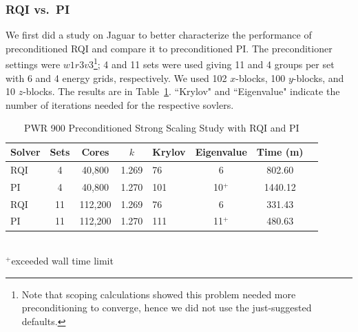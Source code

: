 \documentclass{article}                                                                           %
\begin{document}
\subsubsection{RQI vs.\ PI}
We first did a study on Jaguar \cite{jaguar2010} to better characterize the performance of preconditioned RQI and compare it to preconditioned PI. The preconditioner settings were $w1r3v3$\footnote{Note that scoping calculations showed this problem needed more preconditioning to converge, hence we did not use the just-suggested defaults.}; 4 and 11 sets were used giving 11 and 4 groups per set with 6 and 4 energy grids, respectively. We used 102 $x$-blocks, 100 $y$-blocks, and 10 $z$-blocks. The results are in Table~\ref{table:full PWR}. ``Krylov" and ``Eigenvalue" indicate the number of iterations needed for the respective sovlers.
%
\begin{table}[!h]
\caption{PWR 900 Preconditioned Strong Scaling Study with RQI and PI}
\begin{center}
\begin{tabular}{| l | c | c | c | l | c | c | l |}
\hline
Solver & Sets & Cores & $k$ & Krylov & Eigenvalue & Time (m) \\[0.5ex]
\hline
RQI & 4   & 40,800   & 1.269 & 76   &  6               & 802.60  \\
PI    & 4   & 40,800   & 1.270 & 101 & 10$^{+}$ & 1440.12  \\
RQI & 11 & 112,200 & 1.269 & 76   & 6                & 331.43    \\
PI    & 11 & 112,200 & 1.270 & 111 & 11$^{+}$ & 480.63     \\
\hline 
\end{tabular}\\
$^{+}$exceeded wall time limit %
\end{center}
\label{table:full PWR}
\end{table}  
\end{document}
